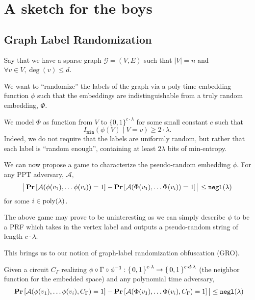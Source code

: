 \section{A sketch for the boys}
\newcommand{\graph}{\mathcal{G}}
\newcommand{\verts}{V}
\newcommand{\edges}{E}
\newcommand{\maxDeg}{d}
\newcommand{\nVerts}{n}
\newcommand{\embedFn}{\phi}
\newcommand{\idealEmbedFn}{\Phi}
\newcommand{\circNeigb}{C_\Gamma}

\newcommand{\advers}{\mathcal{A}}

\newcommand{\minEntropy}{I_\texttt{min}}

\subsection{Graph Label Randomization}
Say that we have a sparse graph $\graph = (\verts, \edges)$ such that $|\verts| = n$
and $\forall v \in \verts, \deg(v) \leq d$.

We want to ``randomize'' the labels of the graph via a poly-time embedding function $\phi$
such that the embeddings are indistinguishable from a truly random embedding, $\idealEmbedFn$.

We model $\idealEmbedFn$ as function from $\verts$ to $\{0, 1\}^{c \cdot \lambda}$ for some small constant $c$
such that 
\begin{equation*}
	\minEntropy(\phi(V) \mid V = v) \geq 2 \cdot \lambda.
\end{equation*}
Indeed, we do not require that the labels are uniformly random, but rather that each label is ``random enough'',
containing at least $2 \lambda$ bits of min-entropy.


We can now propose a game to characterize the pseudo-random embedding $\phi$.
For any PPT adversary, $\advers$,
\begin{equation}
	\big|
		\Pr\left[\advers(\phi(v_1), \dots \phi(v_{i})) = 1\right]
		 - 
		\Pr\left[\advers(\idealEmbedFn(v_1), \dots \idealEmbedFn(v_{i})) = 1\right]
	\big|
		\leq \negl(\lambda)
\end{equation}
for some $i \in \operatorname{poly}(\lambda)$.

The above game may prove to be uninteresting as we can simply describe $\phi$ to be a PRF 
which takes in the vertex label and outputs a pseudo-random string of length $c \cdot \lambda$.

This brings us to our notion of graph-label randomization obfuscation (GRO).

\begin{definition}
	Given a circuit $\circNeigb$ realizing $\phi \circ \Gamma \circ \phi^{-1}: \set{0, 1}^{c \cdot \lambda} \rightarrow \set{0, 1}^{c \cdot d \cdot \lambda}$ (the neighbor function for the embedded space)
	and any polynomial time adversary,
	\begin{equation}
	\big|
		\Pr\left[\advers(\phi(v_1), \dots \phi(v_{i}), \circNeigb) = 1\right]
		 - 
		\Pr\left[\advers(\idealEmbedFn(v_1), \dots \idealEmbedFn(v_{i}), \circNeigb) = 1\right]
	\big|
		\leq \negl(\lambda)
	\end{equation}
\end{definition}

